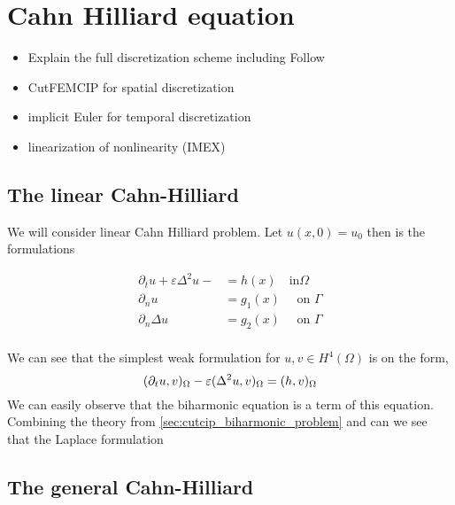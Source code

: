 
\newpage
\section{Cahn Hilliard equation }%
\label{sec:cahn_hilliard_equation}


\begin{itemize}
    \item Explain the full discretization scheme including Follow \cite{feng2007fully}
    \item CutFEMCIP for spatial discretization
    \item implicit Euler for temporal discretization
    \item linearization of nonlinearity (IMEX)
\end{itemize}


\subsection{The linear Cahn-Hilliard}%

We will consider linear Cahn Hilliard problem. Let $ u( x,0) =  u_{0}$ then is the formulations

\begin{equation}
\label{eq:ch_exact}
    \begin{split}
        \partial _{t} u  + \varepsilon \Delta^2   u -   & =  h(x)  \quad \text{in} \Omega \\
        \partial _{n} u & =  g_{1}(x)  \quad \text{ on } \Gamma \\
         \partial _{n} \Delta u & = g_{2}(x)  \quad \text{ on } \Gamma  \\
    \end{split}
\end{equation}



We can see that the simplest weak formulation for $u,v \in H^{4}( \Omega ) $ is on the form,
\[
( \partial _{t}u, v )_{\Omega }  - \varepsilon ( \Delta^2 u, v)_{\Omega } = ( h,v)_{\Omega }   \\
\]
We can easily observe that the biharmonic equation is a term of this equation. Combining the theory from \ref{sec:cutcip_biharmonic_problem} and can we see that the Laplace formulation



\subsection{The general Cahn-Hilliard}%
\label{sub:the_problem}

